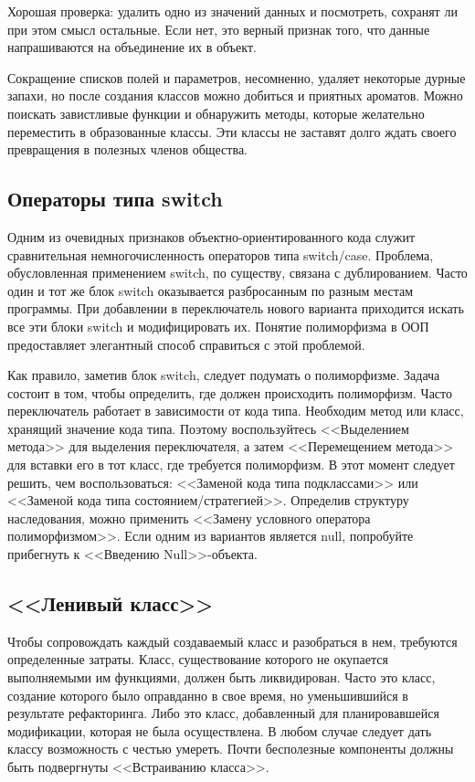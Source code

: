 \documentclass{../../text-style}
\begin{document}
Хорошая проверка: удалить одно из значений данных и посмотреть, сохранят ли при этом смысл остальные. Если нет, это верный признак того, что данные напрашиваются на объединение их в объект.

Сокращение списков полей и параметров, несомненно, удаляет некоторые дурные запахи, но после создания классов можно добиться и приятных ароматов. Можно поискать завистливые функции и обнаружить методы, которые желательно переместить в образованные классы. Эти классы не заставят долго ждать своего превращения в полезных членов общества.

\subsection{Операторы типа switch}

Одним из очевидных признаков объектно-ориентированного кода служит сравнительная немногочисленность операторов типа switch/case. Проблема, обусловленная применением switch, по существу, связана с дублированием. Часто один и тот же блок switch оказывается разбросанным по разным местам программы. При добавлении в переключатель нового варианта приходится искать все эти блоки switch и модифицировать их. Понятие полиморфизма в ООП предоставляет элегантный способ справиться с этой проблемой.

Как правило, заметив блок switch, следует подумать о полиморфизме. Задача состоит в том, чтобы определить, где должен происходить полиморфизм. Часто переключатель работает в зависимости от кода типа. Необходим метод или класс, хранящий значение кода типа. Поэтому воспользуйтесь <<Выделением метода>> для выделения переключателя, а затем <<Перемещением метода>> для вставки его в тот класс, где требуется полиморфизм. В этот момент следует решить, чем воспользоваться: <<Заменой кода типа подклассами>> или <<Заменой кода типа состоянием/стратегией>>. Определив структуру наследования, можно применить <<Замену условного оператора полиморфизмом>>. Если одним из вариантов является null, попробуйте прибегнуть к <<Введению Null>>-объекта.

\subsection{<<Ленивый класс>>}

Чтобы сопровождать каждый создаваемый класс и разобраться в нем, требуются определенные затраты. Класс, существование которого не окупается выполняемыми им функциями, должен быть ликвидирован. Часто это класс, создание которого было оправданно в свое время, но уменьшившийся в результате рефакторинга. Либо это класс, добавленный для планировавшейся модификации, которая не была осуществлена. В любом случае следует дать классу возможность с честью умереть. Почти бесполезные компоненты должны быть подвергнуты <<Встраиванию класса>>.
\end{document}
